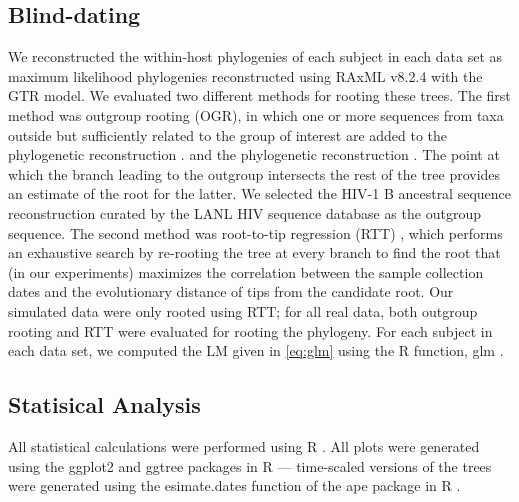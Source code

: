 \documentclass[9pt,twocolumn,twoside,lineno]{pnas-new}
\begin{document}
{\subsection*{Blind-dating}
We reconstructed the within-host phylogenies of each subject in each data set as maximum likelihood phylogenies reconstructed using RAxML v8.2.4 \cite{raxml} with the GTR model.
We evaluated two different methods for rooting these trees. 
The first method was outgroup rooting (OGR), in which one or more sequences from taxa outside but sufficiently related to the group of interest are added to the phylogenetic reconstruction \cite{Huelsenbeck02}. and the phylogenetic reconstruction \cite{Huelsenbeck02}.
The point at which the branch leading to the outgroup intersects the rest of the tree provides an estimate of the root for the latter.
We selected the HIV-1 B ancestral sequence reconstruction curated by the LANL HIV sequence database \cite{LosAlamos} as the outgroup sequence.
The second method was root-to-tip regression (RTT) \cite{Korber00}, which performs an exhaustive search by re-rooting the tree at every branch to find the root that (in our experiments) maximizes the correlation between the sample collection dates and the evolutionary distance of tips from the candidate root.
Our simulated data were only rooted using RTT; for all real data, both outgroup rooting and RTT were evaluated for rooting the phylogeny.
For each subject in each data set, we computed the LM given in \cref{eq:glm} using the R function, glm \cite{rscript}.
\subsection*{Statisical Analysis}
All statistical calculations were performed using R \cite{rscript}.
All plots were generated using the ggplot2 and ggtree packages in R \cite{ggplot,ggtree} --- time-scaled versions of the trees were generated using the esimate.dates function of the ape package in R \cite{ape,nodedating}.
}

\showmatmethods{} %



\pnasbreak{}


\end{document}
